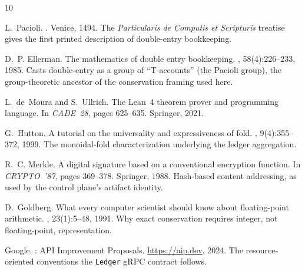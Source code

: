 \begin{thebibliography}{10}

L.~Pacioli.
.
\newblock Venice, 1494.
\newblock The \emph{Particularis de Computis et Scripturis} treatise
gives the first printed description of double-entry bookkeeping.

D.~P. Ellerman.
\newblock The mathematics of double entry bookkeeping.
, 58(4):226--233, 1985.
\newblock Casts double-entry as a group of ``T-accounts'' (the Pacioli
group), the group-theoretic ancestor of the conservation framing used
here.

L.~de~Moura and S.~Ullrich.
\newblock The {Lean}~4 theorem prover and programming language.
\newblock In {\em CADE~28}, pages 625--635. Springer, 2021.

G.~Hutton.
\newblock A tutorial on the universality and expressiveness of fold.
, 9(4):355--372, 1999.
\newblock The monoidal-fold characterization underlying the ledger
aggregation.

R.~C. Merkle.
\newblock A digital signature based on a conventional encryption
function.
\newblock In {\em CRYPTO~'87}, pages 369--378. Springer, 1988.
\newblock Hash-based content addressing, as used by the control plane's
artifact identity.

D.~Goldberg.
\newblock What every computer scientist should know about floating-point
arithmetic.
, 23(1):5--48, 1991.
\newblock Why exact conservation requires integer, not floating-point,
representation.

Google.
: {API} Improvement Proposals.
\newblock \url{https://aip.dev}, 2024.
\newblock The resource-oriented conventions the \texttt{Ledger} gRPC
contract follows.

\end{thebibliography}
